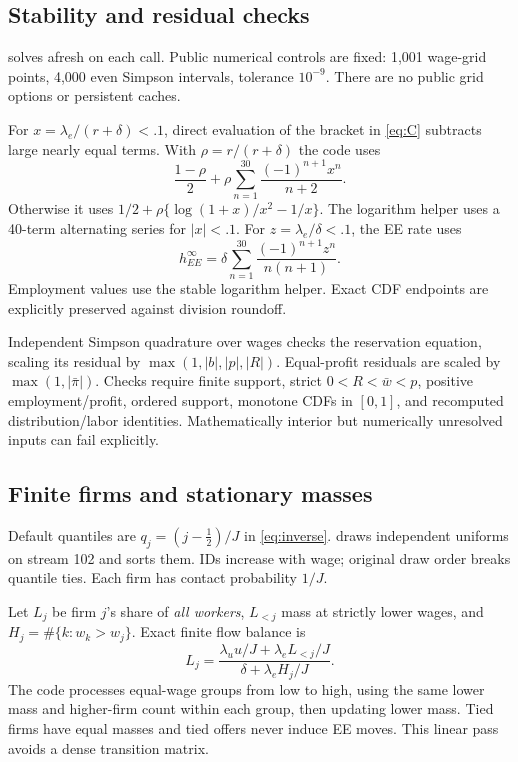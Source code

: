 \documentclass[11pt,letterpaper]{article}
\newcommand{\code}[1]{\texttt{\detokenize{#1}}}
\begin{document}
\subsection{Stability and residual checks}
\code{src/fesim_bm.mata} solves afresh on each call. Public numerical
controls are fixed: 1,001 wage-grid points, 4,000 even Simpson intervals,
tolerance $10^{-9}$. There are no public grid options or persistent caches.

For $x=\lambda_e/(r+\delta)<.1$, direct evaluation of the bracket in
\eqref{eq:C} subtracts large nearly equal terms. With $\rho=r/(r+\delta)$
the code uses
\[
\frac{1-\rho}{2}+
\rho\sum_{n=1}^{30}\frac{(-1)^{n+1}x^n}{n+2}.
\]
Otherwise it uses $1/2+\rho\{\log(1+x)/x^2-1/x\}$.
The logarithm helper uses a 40-term alternating series for $|x|<.1$.
For $z=\lambda_e/\delta<.1$, the EE rate uses
\[
h_{EE}^{\infty}
=\delta\sum_{n=1}^{30}\frac{(-1)^{n+1}z^n}{n(n+1)}.
\]
Employment values use the stable logarithm helper. Exact CDF endpoints
are explicitly preserved against division roundoff.

Independent Simpson quadrature over wages checks the reservation equation,
scaling its residual by $\max(1,|b|,|p|,|R|)$. Equal-profit residuals
are scaled by $\max(1,|\bar\pi|)$. Checks require finite support, strict
$0<R<\bar w<p$, positive employment/profit, ordered support, monotone
CDFs in $[0,1]$, and recomputed distribution/labor identities.
Mathematically interior but numerically unresolved inputs can fail explicitly.

\subsection{Finite firms and stationary masses}\label{app:finite}
Default quantiles are $q_j=(j-\tfrac12)/J$ in \eqref{eq:inverse}.
\code{random_firms=1} draws independent uniforms on stream 102 and sorts
them. IDs increase with wage; original draw order breaks quantile ties.
Each firm has contact probability $1/J$.

Let $L_j$ be firm $j$'s share of \emph{all workers}, $L_{<j}$ mass at
strictly lower wages, and $H_j=\#\{k:w_k>w_j\}$. Exact finite flow balance is
\begin{equation}
L_j=\frac{\lambda_u u/J+\lambda_e L_{<j}/J}
          {\delta+\lambda_e H_j/J}.\label{eq:finite}
\end{equation}
The code processes equal-wage groups from low to high, using the same
lower mass and higher-firm count within each group, then updating lower
mass. Tied firms have equal masses and tied offers never induce EE moves.
This linear pass avoids a dense transition matrix.
\end{document}
